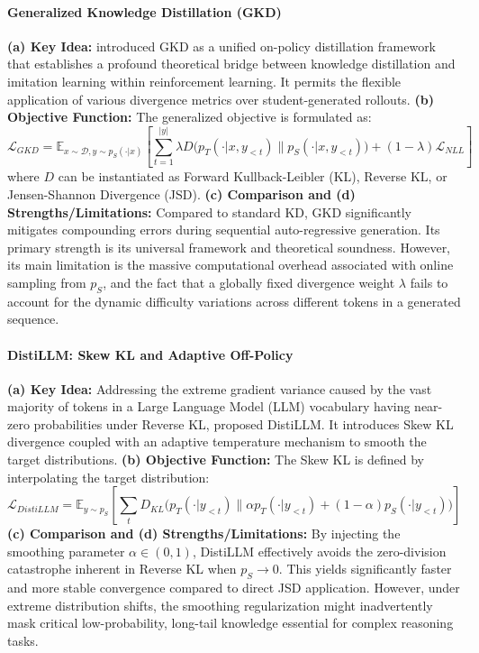 \paragraph{Generalized Knowledge Distillation (GKD)}
\textbf{(a) Key Idea:} \citet{2306.13649} introduced GKD as a unified on-policy distillation framework that establishes a profound theoretical bridge between knowledge distillation and imitation learning within reinforcement learning. It permits the flexible application of various divergence metrics over student-generated rollouts.
\textbf{(b) Objective Function:} The generalized objective is formulated as:
\begin{equation}
    \mathcal{L}_{GKD} = \mathbb{E}_{x \sim \mathcal{D}, y \sim p_S(\cdot|x)} \left[ \sum_{t=1}^{|y|} \lambda D\big( p_T(\cdot|x, y_{<t}) \parallel p_S(\cdot|x, y_{<t}) \big) + (1-\lambda) \mathcal{L}_{NLL} \right]
    \label{eq:gkd}
\end{equation}
where $D$ can be instantiated as Forward Kullback-Leibler (KL), Reverse KL, or Jensen-Shannon Divergence (JSD).
\textbf{(c) Comparison and (d) Strengths/Limitations:} Compared to standard KD, GKD significantly mitigates compounding errors during sequential auto-regressive generation. Its primary strength is its universal framework and theoretical soundness. However, its main limitation is the massive computational overhead associated with online sampling from $p_S$, and the fact that a globally fixed divergence weight $\lambda$ fails to account for the dynamic difficulty variations across different tokens in a generated sequence.

\paragraph{DistiLLM: Skew KL and Adaptive Off-Policy}
\textbf{(a) Key Idea:} Addressing the extreme gradient variance caused by the vast majority of tokens in a Large Language Model (LLM) vocabulary having near-zero probabilities under Reverse KL, \citet{2402.03898} proposed DistiLLM. It introduces Skew KL divergence coupled with an adaptive temperature mechanism to smooth the target distributions.
\textbf{(b) Objective Function:} The Skew KL is defined by interpolating the target distribution:
\begin{equation}
    \mathcal{L}_{DistiLLM} = \mathbb{E}_{y \sim p_S} \left[ \sum_t D_{KL}\big(p_T(\cdot|y_{<t}) \parallel \alpha p_T(\cdot|y_{<t}) + (1-\alpha) p_S(\cdot|y_{<t})\big) \right]
    \label{eq:distillm}
\end{equation}
\textbf{(c) Comparison and (d) Strengths/Limitations:} By injecting the smoothing parameter $\alpha \in (0, 1)$, DistiLLM effectively avoids the zero-division catastrophe inherent in Reverse KL when $p_S \to 0$. This yields significantly faster and more stable convergence compared to direct JSD application. However, under extreme distribution shifts, the smoothing regularization might inadvertently mask critical low-probability, long-tail knowledge essential for complex reasoning tasks.


